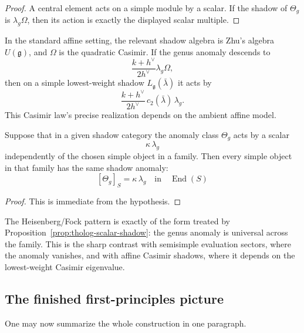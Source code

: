 \begin{proof}
A central element acts on a simple module by a scalar.
If the shadow of \(\Theta_{g}\) is \(\lambda_{g}\Omega\), then its action is exactly the displayed scalar multiple.
\end{proof}

\begin{remark}
\label{rem:tholog-affine-zhu-shadow}
In the standard affine setting, the relevant shadow algebra is Zhu's algebra \(U(\mathfrak{g})\), and \(\Omega\) is the quadratic Casimir.
If the genus anomaly descends to
\[
\frac{k+h^{\vee}}{2h^{\vee}}\lambda_{g}\Omega,
\]
then on a simple lowest-weight shadow \(L_{\mathfrak{g}}(\bar\lambda)\) it acts by
\[
\frac{k+h^{\vee}}{2h^{\vee}}\,c_{2}(\bar\lambda)\,\lambda_{g}.
\]
This Casimir law's precise realization depends on the ambient affine model.
\end{remark}

\begin{proposition}
\label{prop:tholog-scalar-shadow}
Suppose that in a given shadow category the anomaly class \(\Theta_{g}\) acts by a scalar
\[
\kappa\,\lambda_{g}
\]
independently of the chosen simple object in a family.
Then every simple object in that family has the same shadow anomaly:
\[
[\Theta_{g}]_{S}=\kappa\,\lambda_{g}
\quad\text{in}\quad
\operatorname{End}(S)
\]
\end{proposition}

\begin{proof}
This is immediate from the hypothesis.
\end{proof}

\begin{remark}
\label{rem:tholog-fock-family-shadow}
The Heisenberg/Fock pattern is exactly of the form treated by Proposition~\ref{prop:tholog-scalar-shadow}: the genus anomaly is universal across the family.
This is the sharp contrast with semisimple evaluation sectors, where the anomaly vanishes, and with affine Casimir shadows, where it depends on the lowest-weight Casimir eigenvalue.
\end{remark}

\subsection{The finished first-principles picture}
\label{subsec:tholog-finished-picture}

One may now summarize the whole construction in one paragraph.

